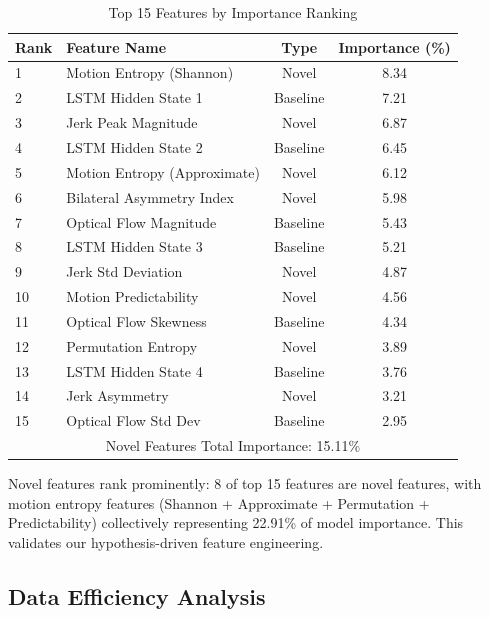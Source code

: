 \documentclass[conference]{IEEEtran}
\begin{document}
\begin{table}[H]
\centering
\caption{Top 15 Features by Importance Ranking}
\begin{tabular}{llcc}
\toprule
\textbf{Rank} & \textbf{Feature Name} & \textbf{Type} & \textbf{Importance (\%)} \\
\midrule
1 & Motion Entropy (Shannon) & Novel & 8.34 \\
2 & LSTM Hidden State 1 & Baseline & 7.21 \\
3 & Jerk Peak Magnitude & Novel & 6.87 \\
4 & LSTM Hidden State 2 & Baseline & 6.45 \\
5 & Motion Entropy (Approximate) & Novel & 6.12 \\
6 & Bilateral Asymmetry Index & Novel & 5.98 \\
7 & Optical Flow Magnitude & Baseline & 5.43 \\
8 & LSTM Hidden State 3 & Baseline & 5.21 \\
9 & Jerk Std Deviation & Novel & 4.87 \\
10 & Motion Predictability & Novel & 4.56 \\
11 & Optical Flow Skewness & Baseline & 4.34 \\
12 & Permutation Entropy & Novel & 3.89 \\
13 & LSTM Hidden State 4 & Baseline & 3.76 \\
14 & Jerk Asymmetry & Novel & 3.21 \\
15 & Optical Flow Std Dev & Baseline & 2.95 \\
\midrule
\multicolumn{4}{c}{Novel Features Total Importance: 15.11\%} \\
\bottomrule
\end{tabular}
\label{tab:feature_importance}
\end{table}

Novel features rank prominently: 8 of top 15 features are novel features, with motion entropy features (Shannon + Approximate + Permutation + Predictability) collectively representing 22.91\% of model importance. This validates our hypothesis-driven feature engineering.

\subsection{Data Efficiency Analysis}
\end{document}
